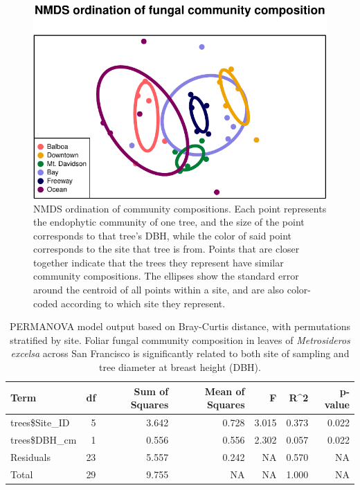 \documentclass[fleqn,10pt,lineno]{wlpeerj} %
\begin{document}
\begin{figure}
\centering
\includegraphics{gibson2023_files/figure-latex/nmds-plot-1.pdf}
\caption{\label{fig:nmds-plot}NMDS ordination of community compositions. Each point represents the endophytic community of one tree, and the size of the point corresponds to that tree's DBH, while the color of said point corresponds to the site that tree is from. Points that are closer together indicate that the trees they represent have similar community compositions. The ellipses show the standard error around the centroid of all points within a site, and are also color-coded according to which site they represent.}
\end{figure}

\begin{table}[!h]

\caption{\label{tab:permanova-table}PERMANOVA model output based on Bray-Curtis distance, with permutations stratified by site. Foliar fungal community composition in leaves of \emph{Metrosideros excelsa} across San Francisco is significantly related to both site of sampling and tree diameter at breast height (DBH).}
\centering
\begin{tabular}[t]{lrrrrrr}
\toprule
Term & df & Sum of Squares & Mean of Squares & F & R\textasciicircum{}2 & p-value\\
\midrule
trees\$Site\_ID & 5 & 3.642 & 0.728 & 3.015 & 0.373 & 0.022\\
trees\$DBH\_cm & 1 & 0.556 & 0.556 & 2.302 & 0.057 & 0.022\\
Residuals & 23 & 5.557 & 0.242 & NA & 0.570 & NA\\
Total & 29 & 9.755 & NA & NA & 1.000 & NA\\
\bottomrule
\end{tabular}
\end{table}
\end{document}
